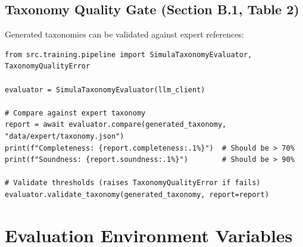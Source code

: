 \documentclass[12pt,a4paper,twoside]{report}
\begin{document}
\subsection{Taxonomy Quality Gate (Section B.1, Table 2)}

Generated taxonomies can be validated against expert references:

\begin{lstlisting}[language=jsonx,caption={Taxonomy quality gate}]
from src.training.pipeline import SimulaTaxonomyEvaluator, TaxonomyQualityError

evaluator = SimulaTaxonomyEvaluator(llm_client)

# Compare against expert taxonomy
report = await evaluator.compare(generated_taxonomy, "data/expert/taxonomy.json")
print(f"Completeness: {report.completeness:.1%}")  # Should be > 70%
print(f"Soundness: {report.soundness:.1%}")        # Should be > 90%

# Validate thresholds (raises TaxonomyQualityError if fails)
evaluator.validate_taxonomy(generated_taxonomy, report=report)
\end{lstlisting}

\section{Evaluation Environment Variables}
\end{document}
